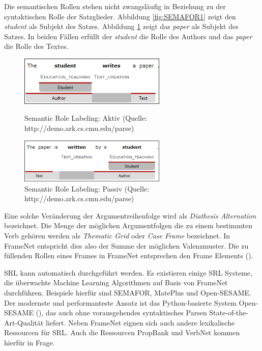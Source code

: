 Die semantischen Rollen stehen nicht zwangsläufig in Beziehung zu der syntaktischen Rolle der Satzglieder. Abbildung  \ref{fig:SEMAFOR1} zeigt den \textit{student} als Subjekt des Satzes. Abbildung \ref{fig:SEMAFOR2} zeigt das \textit{paper} als Subjekt des Satzes. In beiden Fällen erfüllt der \textit{student} die Rolle des Authors und das \textit{paper} die Rolle des Textes.
\par
\begin{figure}
\includegraphics[width=7cm]{pictures/SEMAFOR1.png}
\caption{Semantic Role Labeling: Aktiv (Quelle: http://demo.ark.cs.cmu.edu/parse)}
\label{fig:SEMAFOR1}
\includegraphics[width=7cm]{pictures/SEMAFOR2.png}
\caption{Semantic Role Labeling: Passiv (Quelle: http://demo.ark.cs.cmu.edu/parse)}
\label{fig:SEMAFOR2}
\end{figure}
\par
Eine solche Veränderung der Argumentreihenfolge wird als \textit{Diathesis Alternation} bezeichnet. Die Menge der möglichen Argumentfolgen die zu einem bestimmten Verb gehören werden als \textit{Thematic Grid} oder \textit{Case Frame} bezeichnet. In FrameNet entspricht dies also der Summe der möglichen Valenzmuster. Die zu füllenden Rollen eines Frames in FrameNet entsprechen den Frame Elements (\cite[vgl.][383]{JURAFSKY}).
\par
\ac{SRL} kann automatisch durchgeführt werden. Es existieren einige \ac{SRL} Systeme, die überwachte Machine Learning Algorithmen auf Basis von FrameNet durchführen. Beispiele hierfür sind SEMAFOR, MatePlus und Open-SESAME. Der modernste und performanteste Ansatz ist das Python-basierte System Open-SESAME (\cite[vgl.][8]{SWAYAMDIPTA}), das auch ohne vorausgehendes syntaktisches Parsen State-of-the-Art-Qualität liefert.
Neben FrameNet eignen sich auch andere lexikalische Ressourcen für \ac{SRL}. Auch die Ressourcen PropBank und VerbNet kommen hierfür in Frage.
